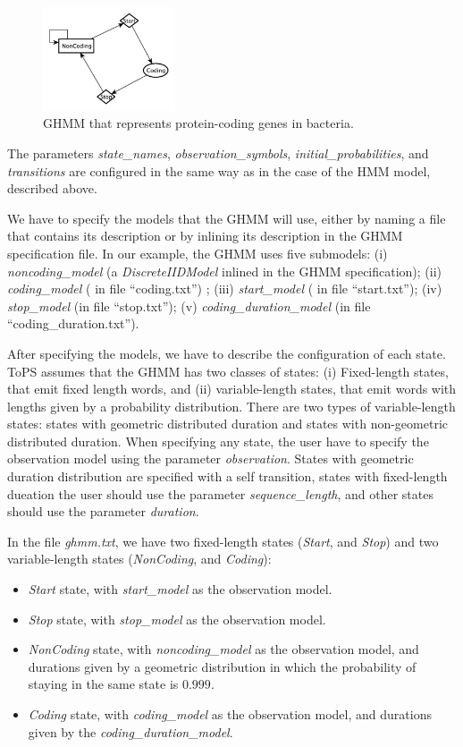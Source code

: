 \begin{figure}[htpb]
  \centering
  \includegraphics[width=0.35\textwidth]{ghmm}
  \caption{GHMM that represents protein-coding genes in bacteria.}
  \label{fig:ghmm}
\end{figure}


The parameters \textit{state\_names}, \textit{observation\_symbols}, \textit{initial\_proba\-bilities}, and \textit{transi\-tions} are configured in the same way as in the case of  the HMM model, described above.

We have to specify the models that the GHMM will use, either by naming a file that contains its description or by inlining its description in the GHMM specification file. In our example, the GHMM uses five submodels: (i) \textit{noncoding\_model} (a \textit{DiscreteIIDModel} inlined in the GHMM specification); (ii) \textit{coding\_model} ( in file ``coding.txt'') ; (iii) \textit{start\_model} ( in file ``start.txt''); (iv) \textit{stop\_model} (in file ``stop.txt''); (v) \textit{coding\_duration\_model} (in file ``coding\_duration.txt'').

After specifying the models, we have to describe the configuration of each state. ToPS assumes that the GHMM has two classes of states: (i) Fixed-length  states, that  emit fixed length words, and  (ii) variable-length states, that emit words with lengths given by a probability distribution. There are two types of variable-length states:  states with geometric distributed duration and states with non-geometric distributed duration. When specifying any state, the user have to specify the observation model using the parameter \textit{observation}. States with geometric duration distribution are specified with a self transition, states with  fixed-length dueation the user should use the parameter \textit{sequence\_length}, and other states should use the  parameter \textit{duration}.

In the file \textit{ghmm.txt}, we have two fixed-length states (\textit{Start}, and \textit{Stop}) and two variable-length states (\textit{NonCoding}, and \textit{Coding}):
\begin{itemize}
  \item \textit{Start} state, with \textit{start\_model} as the observation model.
\item\textit{Stop} state, with \textit{stop\_model} as  the observation model. 
\item \textit{NonCoding} state, with   \textit{noncoding\_model} as the observation model, and durations  given by a geometric distribution in which the probability of staying in the same state is $0.999$. 
\item \textit{Coding} state,  with \textit{coding\_model} as the observation model, and durations  given by the \textit{coding\_duration\_model}.
\end{itemize}


